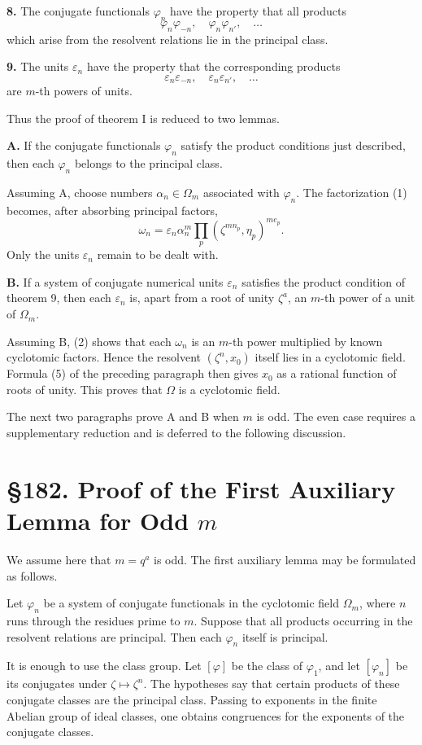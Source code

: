 \documentclass[12pt,a4paper]{article}
\newcommand{\webersection}[2]{\clearpage\section*{\S #1. #2}}
\newcommand{\Om}{\Omega_m}
\newcommand{\zetaS}{\zeta}
\begin{document}
\textbf{8.} The conjugate functionals \(\varphi_n\) have the property that all products
\[
  \varphi_n\varphi_{-n},\quad \varphi_n\varphi_{n'},\quad\ldots
\]
which arise from the resolvent relations lie in the principal class.

\textbf{9.} The units \(\varepsilon_n\) have the property that the corresponding products
\[
  \varepsilon_n\varepsilon_{-n},\quad \varepsilon_n\varepsilon_{n'},\quad\ldots
\]
are \(m\)-th powers of units.

Thus the proof of theorem I is reduced to two lemmas.

\textbf{A.} If the conjugate functionals \(\varphi_n\) satisfy the product conditions just described, then each \(\varphi_n\) belongs to the principal class.

Assuming A, choose numbers \(\alpha_n\in\Om\) associated with \(\varphi_n\).  The factorization (1) becomes, after absorbing principal factors,
\[
  \omega_n=\varepsilon_n\alpha_n^m
       \prod_p (\zetaS^{m n_p},\eta_p)^{m e_p}.
\tag{2}
\]
Only the units \(\varepsilon_n\) remain to be dealt with.

\textbf{B.} If a system of conjugate numerical units \(\varepsilon_n\) satisfies the product condition of theorem 9, then each \(\varepsilon_n\) is, apart from a root of unity \(\zetaS^a\), an \(m\)-th power of a unit of \(\Om\).

Assuming B, (2) shows that each \(\omega_n\) is an \(m\)-th power multiplied by known cyclotomic factors.  Hence the resolvent \((\zetaS^n,x_0)\) itself lies in a cyclotomic field.  Formula (5) of the preceding paragraph then gives \(x_0\) as a rational function of roots of unity.  This proves that \(\Omega\) is a cyclotomic field.

The next two paragraphs prove A and B when \(m\) is odd.  The even case requires a supplementary reduction and is deferred to the following discussion.

\webersection{182}{Proof of the First Auxiliary Lemma for Odd \(m\)}

We assume here that \(m=q^a\) is odd.  The first auxiliary lemma may be formulated as follows.

Let \(\varphi_n\) be a system of conjugate functionals in the cyclotomic field \(\Om\), where \(n\) runs through the residues prime to \(m\).  Suppose that all products occurring in the resolvent relations are principal.  Then each \(\varphi_n\) itself is principal.

It is enough to use the class group.  Let \([\varphi]\) be the class of \(\varphi_1\), and let \([\varphi_n]\) be its conjugates under \(\zetaS\mapsto\zetaS^n\).  The hypotheses say that certain products of these conjugate classes are the principal class.  Passing to exponents in the finite Abelian group of ideal classes, one obtains congruences for the exponents of the conjugate classes.
\end{document}
